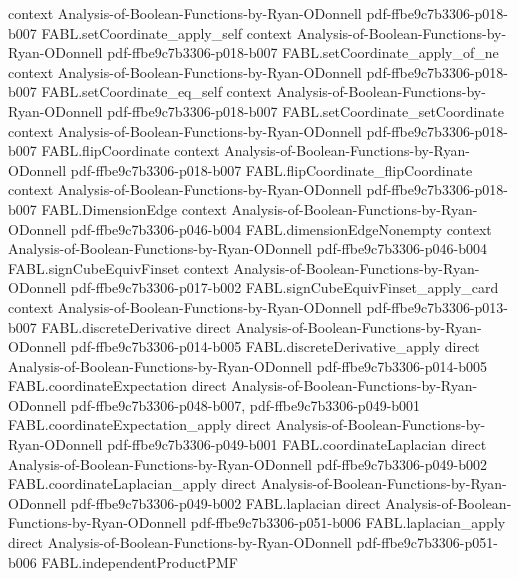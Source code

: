 \begin{theorem}
  {context}
  {Analysis-of-Boolean-Functions-by-Ryan-ODonnell}
  {pdf-ffbe9c7b3306-p018-b007}
\proofstep
  {FABL.setCoordinate_apply_self}
  {context}
  {Analysis-of-Boolean-Functions-by-Ryan-ODonnell}
  {pdf-ffbe9c7b3306-p018-b007}
\proofstep
  {FABL.setCoordinate_apply_of_ne}
  {context}
  {Analysis-of-Boolean-Functions-by-Ryan-ODonnell}
  {pdf-ffbe9c7b3306-p018-b007}
\proofstep
  {FABL.setCoordinate_eq_self}
  {context}
  {Analysis-of-Boolean-Functions-by-Ryan-ODonnell}
  {pdf-ffbe9c7b3306-p018-b007}
\proofstep
  {FABL.setCoordinate_setCoordinate}
  {context}
  {Analysis-of-Boolean-Functions-by-Ryan-ODonnell}
  {pdf-ffbe9c7b3306-p018-b007}
\proofstep
  {FABL.flipCoordinate}
  {context}
  {Analysis-of-Boolean-Functions-by-Ryan-ODonnell}
  {pdf-ffbe9c7b3306-p018-b007}
\proofstep
  {FABL.flipCoordinate_flipCoordinate}
  {context}
  {Analysis-of-Boolean-Functions-by-Ryan-ODonnell}
  {pdf-ffbe9c7b3306-p018-b007}
\proofstep
  {FABL.DimensionEdge}
  {context}
  {Analysis-of-Boolean-Functions-by-Ryan-ODonnell}
  {pdf-ffbe9c7b3306-p046-b004}
\proofstep
  {FABL.dimensionEdgeNonempty}
  {context}
  {Analysis-of-Boolean-Functions-by-Ryan-ODonnell}
  {pdf-ffbe9c7b3306-p046-b004}
\proofstep
  {FABL.signCubeEquivFinset}
  {context}
  {Analysis-of-Boolean-Functions-by-Ryan-ODonnell}
  {pdf-ffbe9c7b3306-p017-b002}
\proofstep
  {FABL.signCubeEquivFinset_apply_card}
  {context}
  {Analysis-of-Boolean-Functions-by-Ryan-ODonnell}
  {pdf-ffbe9c7b3306-p013-b007}
\proofstep
  {FABL.discreteDerivative}
  {direct}
  {Analysis-of-Boolean-Functions-by-Ryan-ODonnell}
  {pdf-ffbe9c7b3306-p014-b005}
\proofstep
  {FABL.discreteDerivative_apply}
  {direct}
  {Analysis-of-Boolean-Functions-by-Ryan-ODonnell}
  {pdf-ffbe9c7b3306-p014-b005}
\proofstep
  {FABL.coordinateExpectation}
  {direct}
  {Analysis-of-Boolean-Functions-by-Ryan-ODonnell}
  {pdf-ffbe9c7b3306-p048-b007,
    pdf-ffbe9c7b3306-p049-b001}
\proofstep
  {FABL.coordinateExpectation_apply}
  {direct}
  {Analysis-of-Boolean-Functions-by-Ryan-ODonnell}
  {pdf-ffbe9c7b3306-p049-b001}
\proofstep
  {FABL.coordinateLaplacian}
  {direct}
  {Analysis-of-Boolean-Functions-by-Ryan-ODonnell}
  {pdf-ffbe9c7b3306-p049-b002}
\proofstep
  {FABL.coordinateLaplacian_apply}
  {direct}
  {Analysis-of-Boolean-Functions-by-Ryan-ODonnell}
  {pdf-ffbe9c7b3306-p049-b002}
\proofstep
  {FABL.laplacian}
  {direct}
  {Analysis-of-Boolean-Functions-by-Ryan-ODonnell}
  {pdf-ffbe9c7b3306-p051-b006}
\proofstep
  {FABL.laplacian_apply}
  {direct}
  {Analysis-of-Boolean-Functions-by-Ryan-ODonnell}
  {pdf-ffbe9c7b3306-p051-b006}
\proofstep
  {FABL.independentProductPMF}

\end{theorem}
